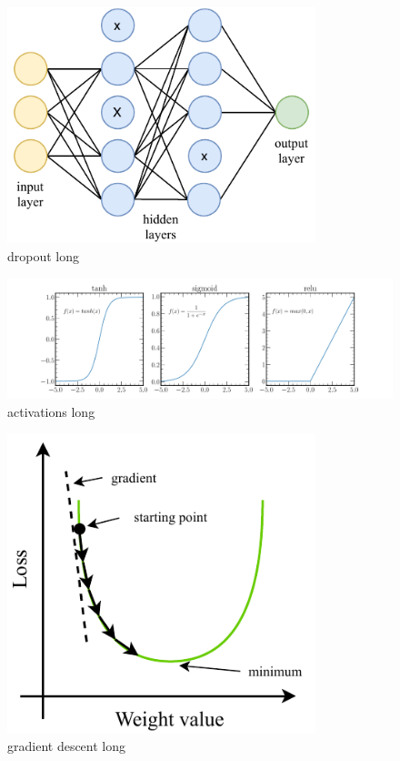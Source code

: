 \begin{figure}
    \includegraphics[width=0.8\textwidth]{diagrams/6-cvn/dropout.pdf}
    \caption[dropout short]
    {dropout long}
    \label{fig:dropout}
\end{figure}

\begin{figure}
    \includegraphics[width=\textwidth]{diagrams/6-cvn/activations.pdf}
    \caption[activations short]
    {activations long}
    \label{fig:activations}
\end{figure}

\begin{figure}
    \includegraphics[width=0.8\textwidth]{diagrams/6-cvn/gradient_descent.pdf}
    \caption[gradient descent short]
    {gradient descent long}
    \label{fig:gradient_descent}
\end{figure}

